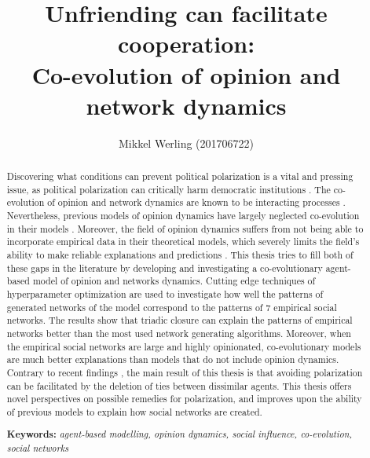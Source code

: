 \documentclass[11pt]{article}
\title{Unfriending can facilitate cooperation: 
\Large \\Co-evolution of opinion and network dynamics}
\author{Mikkel Werling (201706722)}
\date{}
\begin{document}
\maketitle

\begin{abstract}
  \noindent Discovering what conditions can prevent political polarization is a vital and pressing issue, as political polarization can critically harm democratic institutions \cite{boxell_cross-country_2020, levin_dynamics_2021}.
  The co-evolution of opinion and network dynamics are known to be interacting processes \cite{bener_empirical_2016, mcpherson_birds_2001, kossinets_origins_2009}. Nevertheless, previous models of opinion dynamics have largely neglected co-evolution in their models \cite{flache_models_2017,galesic_integrating_2021}.
  Moreover, the field of opinion dynamics suffers from not being able to incorporate empirical data in their theoretical models, which severely limits the field's ability to make reliable explanations and predictions \cite{flache_models_2017,galesic_integrating_2021, mas2019challenges}.
  This thesis tries to fill both of these gaps in the literature by developing and investigating a co-evolutionary agent-based model of opinion and networks dynamics. Cutting edge techniques of hyperparameter optimization are used to investigate how well the patterns of generated networks of the model correspond to the patterns of 7 empirical social networks. 
  The results show that triadic closure can explain the patterns of empirical networks better than the most used network generating algorithms. Moreover, when the empirical social networks are large and highly opinionated, co-evolutionary models are much better explanations than models that do not include opinion dynamics.
  Contrary to recent findings \cite{sasahara_social_2021}, the main result of this thesis is that avoiding polarization can be facilitated by the deletion of ties between dissimilar agents. This thesis offers novel perspectives on possible remedies for polarization, and improves upon the ability of previous models to explain how social networks are created. 
  
  \centering
  \vspace{2mm}
  \noindent \textbf{Keywords:} \textit{agent-based modelling, opinion dynamics, social influence, co-evolution, social networks}
\end{abstract}

\newpage
\tableofcontents
\newpage
\end{document}
